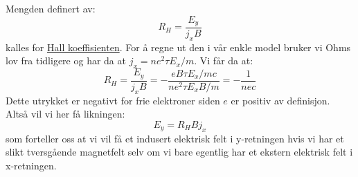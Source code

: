 \documentclass{article}
\begin{document}
Mengden definert av:
\begin{equation}
    \boxed{R_H = \frac{E_y}{j_x B}}
\end{equation}
kalles for \underline{Hall koeffisienten}. For å regne ut den i vår enkle model bruker vi Ohms lov fra tidligere og har da at $j_x = n e^2 \tau E_x / m$. Vi får da at:
\begin{equation}
    R_H = \frac{E_y}{j_x B} = -\frac{e B \tau E_x / mc}{n e^2 \tau E_x B / m} = -\frac{1}{n e c}
\end{equation}
Dette utrykket er negativt for frie elektroner siden $e$ er positiv av definisjon. Altså vil vi her få likningen:
\begin{equation}
    E_y = R_H B j_x
\end{equation}
som forteller oss at vi vil få et indusert elektrisk felt i y-retningen hvis vi har et slikt tversgående magnetfelt selv om vi bare egentlig har et ekstern elektrisk felt i x-retningen.
\end{document}
